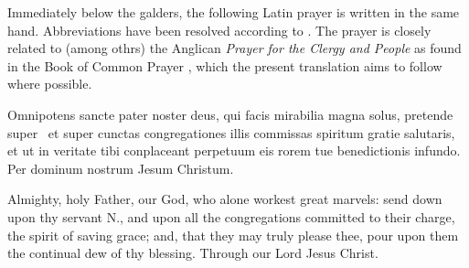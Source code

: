 Immediately below the galders, the following Latin prayer is written in the same hand.  Abbreviations have been resolved according to \textcite[369]{Murdoch1988}.  The prayer is closely related to (among othrs) the Anglican \emph{Prayer for the Clergy and People} as found in the Book of Common Prayer \parencite[58]{ChurchOfEngland1892}, which the present translation aims to follow where possible.

\bpg\bpa%
Omnipotens sancte pater noster deus, qui facis mirabilia magna solus, pretende super ~et super cunctas congregationes illis commissas spiritum gratie salutaris, et ut in veritate tibi conplaceant perpetuum eis rorem tue benedictionis infundo.  Per dominum nostrum Jesum Christum.\epa

\bpb Almighty, holy Father, our God, who alone workest great marvels: send down upon thy servant N., and upon all the congregations committed to their charge, the spirit of saving grace; and, that they may truly please thee, pour upon them the continual dew of thy blessing.  Through our Lord Jesus Christ.\epb\epg

\sectionline
